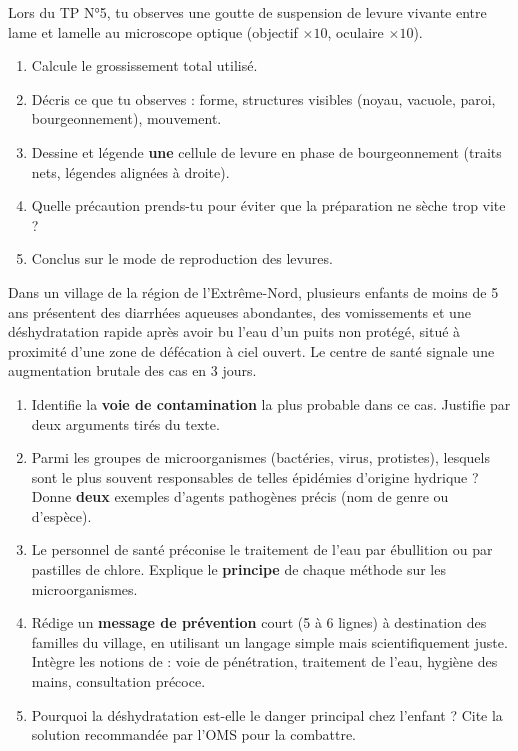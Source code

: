 \documentclass[11pt]{article}
\newcounter{popsec}
\newcounter{popsub}
\newcommand{\courssub}[1]{%
  \stepcounter{popsub}%
  \par\vspace{9pt}\noindent{\popxbold\fontsize{11.5}{13}\selectfont\color{popink}{\color{poporange}\thepopsec.\thepopsub}\hspace{6pt}#1}\par\nopagebreak\vspace{4pt}
}
\begin{document}
\begin{exercice}
Lors du TP N°5, tu observes une goutte de suspension de levure vivante entre lame et lamelle au microscope optique (objectif $\times 10$, oculaire $\times 10$).
\begin{enumerate}
\item Calcule le grossissement total utilisé.
\item Décris ce que tu observes : forme, structures visibles (noyau, vacuole, paroi, bourgeonnement), mouvement.
\item Dessine et légende \textbf{une} cellule de levure en phase de bourgeonnement (traits nets, légendes alignées à droite).
\item Quelle précaution prends-tu pour éviter que la préparation ne sèche trop vite ?
\item Conclus sur le mode de reproduction des levures.
\end{enumerate}
\end{exercice}

\courssub{Je me prépare au BEPC}

\begin{exercice}
Dans un village de la région de l'Extrême-Nord, plusieurs enfants de moins de 5 ans présentent des diarrhées aqueuses abondantes, des vomissements et une déshydratation rapide après avoir bu l'eau d'un puits non protégé, situé à proximité d'une zone de défécation à ciel ouvert. Le centre de santé signale une augmentation brutale des cas en 3 jours.
\begin{enumerate}
\item Identifie la \textbf{voie de contamination} la plus probable dans ce cas. Justifie par deux arguments tirés du texte.
\item Parmi les groupes de microorganismes (bactéries, virus, protistes), lesquels sont le plus souvent responsables de telles épidémies d'origine hydrique ? Donne \textbf{deux} exemples d'agents pathogènes précis (nom de genre ou d'espèce).
\item Le personnel de santé préconise le traitement de l'eau par ébullition ou par pastilles de chlore. Explique le \textbf{principe} de chaque méthode sur les microorganismes.
\item Rédige un \textbf{message de prévention} court (5 à 6 lignes) à destination des familles du village, en utilisant un langage simple mais scientifiquement juste. Intègre les notions de : voie de pénétration, traitement de l'eau, hygiène des mains, consultation précoce.
\item Pourquoi la déshydratation est-elle le danger principal chez l'enfant ? Cite la solution recommandée par l'OMS pour la combattre.
\end{enumerate}
\end{exercice}
\end{document}
